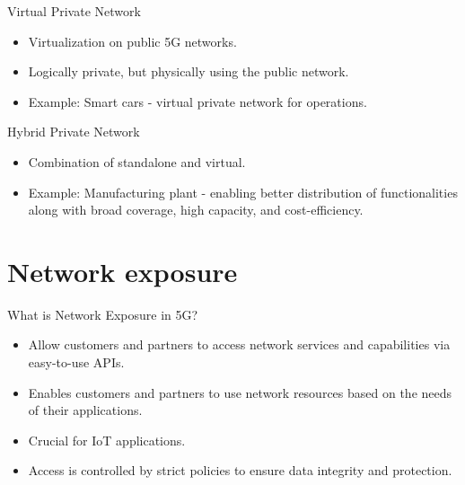 \documentclass{beamer}
\begin{document}
\begin{frame}{Virtual Private Network}
  \vspace*{1.6em}
  \begin{itemize}
    \item Virtualization on public 5G networks.
    \vspace*{0.75em}
    \item Logically private, but physically using the public network.
    \vspace*{0.75em}
    \item Example: Smart cars - virtual private network for operations.
  \end{itemize}
\end{frame}

\begin{frame}{Hybrid Private Network}
  \vspace*{1.6em}
  \begin{itemize}
    \item Combination of standalone and virtual.
    \vspace*{0.75em}
    \item Example: Manufacturing plant - enabling better distribution of functionalities along with broad coverage, high capacity, and cost-efficiency.
  \end{itemize}
\end{frame}

\section[Network exposure]{Network exposure}


\begin{frame}{What is Network Exposure in 5G?}
  \vspace*{1.6em}
  \begin{itemize}
    \item Allow customers and partners to access network services and capabilities via  easy-to-use APIs.
    \item Enables customers and partners to use network resources based on the needs of their applications.
    \item Crucial for IoT applications.
    \item Access is controlled by strict policies to ensure data integrity and protection.
  \end{itemize}
\end{frame}
\end{document}

